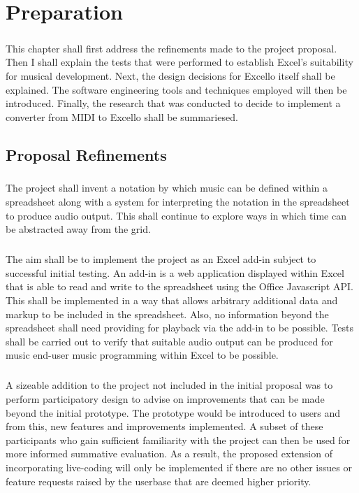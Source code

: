 
\chapter{Preparation}

\paragraph{} This chapter shall first address the refinements made to the project proposal. Then I shall explain the tests that were performed to establish Excel's suitability for musical development. Next, the design decisions for Excello itself shall be explained. The software engineering tools and techniques employed will then be introduced. Finally, the research that was conducted to decide to implement a converter from MIDI to Excello shall be summariesed.

\section{Proposal Refinements}

\paragraph{} The project shall invent a notation by which music can be defined within a spreadsheet along with a system for interpreting the notation in the spreadsheet to produce audio output. This shall continue to explore ways in which time can be abstracted away from the grid.

\paragraph{} The aim shall be to implement the project as an Excel add-in subject to successful initial testing. An add-in is a web application displayed within Excel that is able to read and write to the spreadsheet using the Office Javascript API. This shall be implemented in a way that allows arbitrary additional data and markup to be included in the spreadsheet. Also, no information beyond the spreadsheet shall need providing for playback via the add-in to be possible. Tests shall be carried out to verify that suitable audio output can be produced for music end-user music programming within Excel to be possible.

\paragraph{} A sizeable addition to the project not included in the initial proposal was to perform participatory design \cite{muller:pd} to advise on improvements that can be made beyond the initial prototype. The prototype would be introduced to users and from this, new features and improvements implemented. A subset of these participants who gain sufficient familiarity with the project can then be used for more informed summative evaluation. As a result, the proposed extension of incorporating live-coding will only be implemented if there are no other issues or feature requests raised by the userbase that are deemed higher priority.

